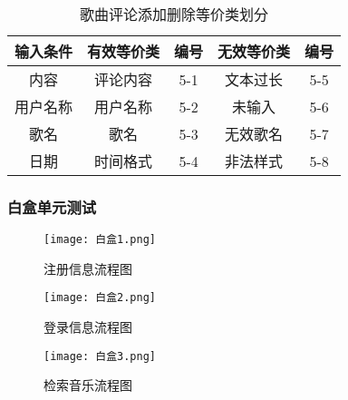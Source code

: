 \documentclass[UTF8,14pt]{article}
\numberwithin{figure}{subsubsection}
\numberwithin{table}{subsubsection}
\begin{document}
\begin{table}[H]
	\centering
	\begin{tabular}{|c|c|c|c|c|}
		\hline
		输入条件 & 有效等价类 & 编号 & 无效等价类 & 编号 \\ \hline
		内容     & 评论内容   & 5-1  & 文本过长   & 5-5  \\ \hline
		用户名称 & 用户名称   & 5-2  & 未输入     & 5-6  \\ \hline
		歌名     & 歌名       & 5-3  & 无效歌名   & 5-7  \\ \hline
		日期     & 时间格式   & 5-4  & 非法样式   & 5-8  \\ \hline
	\end{tabular}
	\caption{歌曲评论添加删除等价类划分}
\end{table}
\subsubsection{白盒单元测试}
\begin{minipage}[t]{0.5\linewidth}
	\centering
	\begin{figure}[H]
		\texttt{[image: 白盒1.png]}
		\caption{注册信息流程图}
	\end{figure}
\end{minipage}
\hfill
\begin{minipage}[t]{0.5\linewidth}
	\centering
	\begin{figure}[H]
		\texttt{[image: 白盒2.png]}
		\caption{登录信息流程图}
	\end{figure}

	\begin{figure}[H]
		\texttt{[image: 白盒3.png]}
		\caption{检索音乐流程图}
	\end{figure}
\end{minipage}
\end{document}
